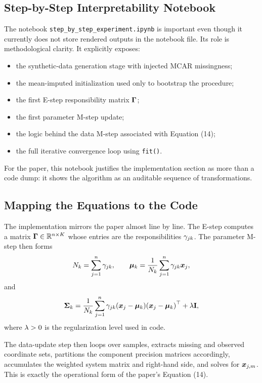 \subsection{Step-by-Step Interpretability Notebook}
The notebook \texttt{step\_by\_step\_experiment.ipynb} is important even though it currently does not store rendered outputs in the notebook file. Its role is methodological clarity. It explicitly exposes:
\begin{itemize}
    \item the synthetic-data generation stage with injected MCAR missingness;
    \item the mean-imputed initialization used only to bootstrap the procedure;
    \item the first E-step responsibility matrix $\mathbf{\Gamma}$;
    \item the first parameter M-step update;
    \item the logic behind the data M-step associated with Equation (14);
    \item the full iterative convergence loop using \texttt{fit()}.
\end{itemize}

For the paper, this notebook justifies the implementation section as more than a code dump: it shows the algorithm as an auditable sequence of transformations.

\subsection{Mapping the Equations to the Code}
The implementation mirrors the paper almost line by line. The E-step computes a matrix $\mathbf{\Gamma} \in \mathbb{R}^{n\times K}$ whose entries are the responsibilities $\gamma_{jk}$. The parameter M-step then forms
\[
    N_k = \sum_{j=1}^{n} \gamma_{jk},
    \qquad
    \bm{\mu}_k = \frac{1}{N_k}\sum_{j=1}^{n}\gamma_{jk}\bm{x}_j,
\]
and
\[
    \mat{\Sigma}_k
    =
    \frac{1}{\scal{N}_k}
    \sum_{j=1}^{\scal{n}}
    \scal{\gamma}_{jk}
    \paren*{\vect{x}_j-\vect{\mu}_k}
    \paren*{\vect{x}_j-\vect{\mu}_k}\trans
    + \scal{\lambda}\mat{I},
\]
where $\lambda>0$ is the regularization level used in code.

The data-update step then loops over samples, extracts missing and observed coordinate sets, partitions the component precision matrices accordingly, accumulates the weighted system matrix and right-hand side, and solves for $\bm{x}_{j,m}$. This is exactly the operational form of the paper's Equation (14).


